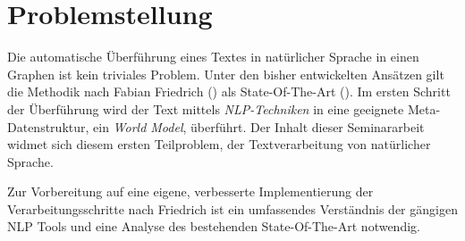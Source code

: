 \section{Problemstellung}

Die automatische Überführung eines Textes in natürlicher Sprache in einen Graphen ist kein triviales Problem. Unter den bisher entwickelten Ansätzen gilt die Methodik nach Fabian Friedrich (\cite[vgl.][]{FRIEDRICH1}) als State-Of-The-Art (\cite[vgl.][]{RIEFER}). Im ersten Schritt der Überführung wird der Text mittels \textit{\ac{NLP}-Techniken} in eine geeignete Meta-Datenstruktur, ein \textit{World Model}, überführt. Der Inhalt dieser Seminararbeit widmet sich diesem ersten Teilproblem, der Textverarbeitung von natürlicher Sprache.
\par
Zur Vorbereitung auf eine eigene, verbesserte Implementierung der Verarbeitungsschritte nach Friedrich ist ein umfassendes Verständnis der gängigen \ac{NLP} Tools und eine Analyse des bestehenden State-Of-The-Art notwendig.



 